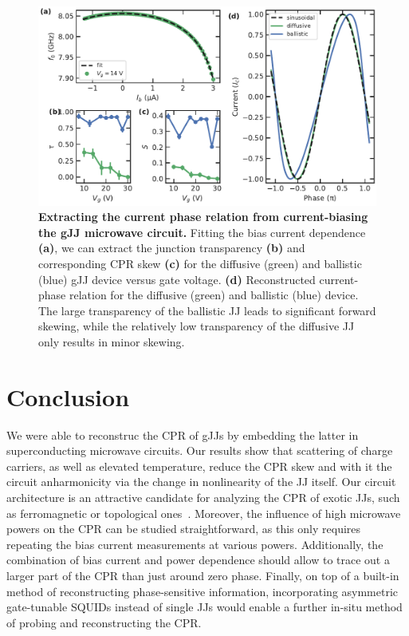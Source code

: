\begin{figure}[t]
	\centering
	\includegraphics[width=\linewidth]{chapter-gJJ-CPR/figs/Figure5}
	\caption{
		\textbf{Extracting the current phase relation from current-biasing the gJJ microwave circuit.}
		Fitting the bias current dependence \textbf{(a)}, we can extract the junction transparency \textbf{(b)} and corresponding CPR skew \textbf{(c)} for the diffusive (green) and ballistic (blue) gJJ device versus gate voltage.
		\textbf{(d)} Reconstructed current-phase relation for the diffusive (green) and ballistic (blue) device.
		The large transparency of the ballistic JJ leads to significant forward skewing, while the relatively low transparency of the diffusive JJ only results in minor skewing.
	}
	\label{fig:figure5}
\end{figure}

\section{Conclusion}

We were able to reconstruc the CPR of gJJs by embedding the latter in superconducting microwave circuits.
%
Our results show that scattering of charge carriers, as well as elevated temperature, reduce the CPR skew and with it the circuit anharmonicity via the change in nonlinearity of the JJ itself.
%
Our circuit architecture is an attractive candidate for analyzing the CPR of exotic JJs, such as ferromagnetic or topological ones~\cite{golubovCurrentphaseRelationJosephson2004a,sochnikovNonsinusoidalCurrentPhaseRelationship2015,stoutimoreSecondHarmonicCurrentPhaseRelation2018,assoulineSpinOrbitInducedPhaseshift2019,muraniMicrowaveSignatureTopological2019}.
%
Moreover, the influence of high microwave powers on the CPR can be studied straightforward, as this only requires repeating the bias current measurements at various powers.
%
Additionally, the combination of bias current and power dependence should allow to trace out a larger part of the CPR than just around zero phase.
%
Finally, on top of a built-in method of reconstructing phase-sensitive information, incorporating asymmetric gate-tunable SQUIDs instead of single JJs would enable a further in-situ method of probing and reconstructing the CPR.

